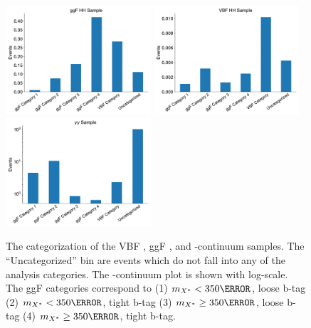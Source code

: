 \begin{figure}
  \centering
  \includegraphics[width=0.48\textwidth]{chapters/chapter6_vbf/images/category_breakdown/ggf_sample.pdf}
  \includegraphics[width=0.48\textwidth]{chapters/chapter6_vbf/images/category_breakdown/vbf_sample.pdf}
  \includegraphics[width=0.48\textwidth]{chapters/chapter6_vbf/images/category_breakdown/yy_sample.pdf}
  \caption[The categorization of the VBF \HH, ggF \HH, and \yy-continuum samples]{The categorization of the VBF \HH, ggF \HH, and \yy-continuum samples. The ``Uncategorized'' bin are events which do not fall into any of the analysis categories. The \yy-continuum plot is shown with log-scale. The \gls{ggF} categories correspond to (1) $m_{X^{*}} < \unit{350}{\GeV}$, loose b-tag (2) $m_{X^{*}} < \unit{350}{\GeV}$, tight b-tag (3) $m_{X^{*}} \geq \unit{350}{\GeV}$, loose b-tag (4) $m_{X^{*}} \geq \unit{350}{\GeV}$, tight b-tag.
  \label{fig:process-categorization}}
\end{figure}



